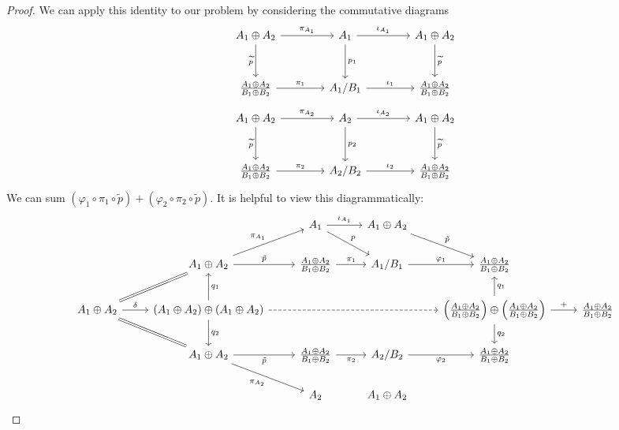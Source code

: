 \documentclass[11pt, letterpaper]{article}
\begin{document}
\begin{proof}
We can apply this identity to our problem by considering the commutative diagrams
\[\begin{tikzcd}[row sep = 3em, column sep = 4em] A_1 \oplus A_2 \ar["\widetilde{p}"', d] \ar["\pi_{A_1}", r] & A_1 \ar["\iota_{A_1}", r] \ar["p_1", d] & A_1 \oplus A_2 \ar["\widetilde{p}", d] \\ \frac{A_1 \oplus A_2}{B_1 \oplus B_2} \ar["\pi_1", r] & A_1/B_1 \ar["\iota_1", r] & \frac{A_1 \oplus A_2}{B_1 \oplus B_2} \end{tikzcd}\]
\[\begin{tikzcd}[row sep = 3em, column sep = 4em] A_1 \oplus A_2 \ar["\widetilde{p}"', d] \ar["\pi_{A_2}", r] & A_2 \ar["\iota_{A_2}", r] \ar["p_2", d] & A_1 \oplus A_2 \ar["\widetilde{p}", d] \\ \frac{A_1 \oplus A_2}{B_1 \oplus B_2} \ar["\pi_2", r] & A_2/B_2 \ar["\iota_2", r] & \frac{A_1 \oplus A_2}{B_1 \oplus B_2} \end{tikzcd}\]
We can sum $(\varphi _1\circ \pi _1 \circ \widetilde{p} )+(\varphi_2 \circ \pi _2 \circ \widetilde{p} )$. It is helpful to view this diagrammatically:
\[\begin{tikzcd}
	&& {A_1} & {A_1\oplus A_2} \\
	& {A_1\oplus A_2} & {\frac{A_1\oplus A_2}{B_1\oplus B_2}} & {A_1/B_1} & {\frac{A_1\oplus A_2}{B_1\oplus B_2}} \\
	{A_1\oplus A_2} & {\left(A_1\oplus A_2\right)\oplus\left(A_1\oplus A_2\right)} &&& {\left(\frac{A_1\oplus A_2}{B_1\oplus B_2}\right)\oplus\left(\frac{A_1\oplus A_2}{B_1\oplus B_2}\right)} & {\frac{A_1\oplus A_2}{B_1\oplus B_2}} \\
	& {A_1\oplus A_2} & {\frac{A_1\oplus A_2}{B_1\oplus B_2}} & {A_2/B_2} & {\frac{A_1\oplus A_2}{B_1\oplus B_2}} \\
	&& {A_2} & {A_1\oplus A_2}
	\arrow["{\iota_{A_1}}", from=1-3, to=1-4]
	\arrow["p", from=1-3, to=2-4]
	\arrow["{\tilde{p}}", from=1-4, to=2-5]
	\arrow["{\pi_{A_1}}", from=2-2, to=1-3]
	\arrow["{\tilde{p}}", from=2-2, to=2-3]
	\arrow["{\pi_1}", from=2-3, to=2-4]
	\arrow["{\varphi_1}", from=2-4, to=2-5]
	\arrow[equals, from=3-1, to=2-2]
	\arrow["\delta", from=3-1, to=3-2]
	\arrow[equals, from=3-1, to=4-2]
	\arrow["{q_1}"', from=3-2, to=2-2]
	\arrow[dashed, from=3-2, to=3-5]
	\arrow["{q_2}", from=3-2, to=4-2]
	\arrow["{q_1}"', from=3-5, to=2-5]
	\arrow["{+}", from=3-5, to=3-6]
	\arrow["{q_2}", from=3-5, to=4-5]
	\arrow["{\tilde{p}}"', from=4-2, to=4-3]
	\arrow["{\pi_{A_2}}"', from=4-2, to=5-3]
	\arrow["{\pi_2}"', from=4-3, to=4-4]
	\arrow["{\varphi_2}"', from=4-4, to=4-5]

\end{tikzcd}\]
\end{proof}
\end{document}
